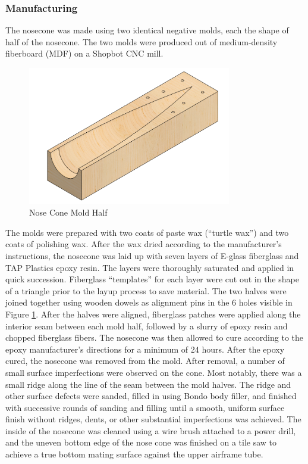 \subsubsection*{Manufacturing}
The nosecone was made using two identical negative molds, each the shape of half of the nosecone. The two molds were produced out of medium-density fiberboard (MDF) on a Shopbot CNC mill. 
\begin{figure}[H]
	\centering
	\includegraphics[width=3.5in]{imgs/noseconemoldhalf.png}
	\caption{Nose Cone Mold Half}
	\label{fig:noseconehalf}
\end{figure}
The molds were prepared with two coats of paste wax (``turtle wax'') and two coats of polishing wax. After the wax dried according to the manufacturer’s instructions, the nosecone was laid up with seven layers of E-glass fiberglass and TAP Plastics epoxy resin. The layers were thoroughly saturated and applied in quick succession. Fiberglass “templates” for each layer were cut out in the shape of a triangle prior to the layup process to save material. 	The two halves were joined together using wooden dowels as alignment pins in the 6 holes visible in Figure \ref{fig:noseconehalf}. After the halves were aligned, fiberglass patches were applied along the interior seam between each mold half, followed by a slurry of epoxy resin and chopped fiberglass fibers. The nosecone was then allowed to cure according to the epoxy manufacturer’s directions for a minimum of 24 hours.
\newline\newline
After the epoxy cured, the nosecone was removed from the mold. After removal, a number of small surface imperfections were observed on the cone. Most notably, there was a small ridge along the line of the seam between the mold halves. The ridge and other surface defects were sanded, filled in using Bondo body filler, and finished with successive rounds of sanding and filling until a smooth, uniform surface finish without ridges, dents, or other substantial imperfections was achieved. The inside of the nosecone was cleaned using a wire brush attached to a power drill, and the uneven bottom edge of the nose cone was finished on a tile saw to achieve a true bottom mating surface against the upper airframe tube.

